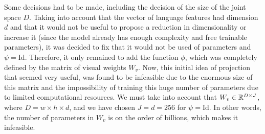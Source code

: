 Some decisions had to be made, including the decision of the size of the joint
space \(D\). Taking into account that the vector of language features had
dimension \(d\) and that it would not be useful to propose a reduction in
dimensionality or increase it (since the model already has enough complexity
and free trainable parameters), it was decided to fix that it would not be used
of parameters and \(\psi = \text{Id}\). Therefore, it only remained to add the
function \(\phi\), which was completely defined by the matrix of visual weights
\(W_v\). Now, this initial idea of projection that seemed very useful, was
found to be infeasible due to the enormous size of this matrix and the
impossibility of training this huge number of parameters due to limited
computational resources. We must take into account that \(W_v \in \mathbb{R}^{D \times
J}\), where \(D = w \times h \times d\), and we have chosen \(J = d = 256\) for
\(\psi = \text{Id}\). In other words, the number of parameters in \(W_v\) is on
the order of billions, which makes it infeasible.

